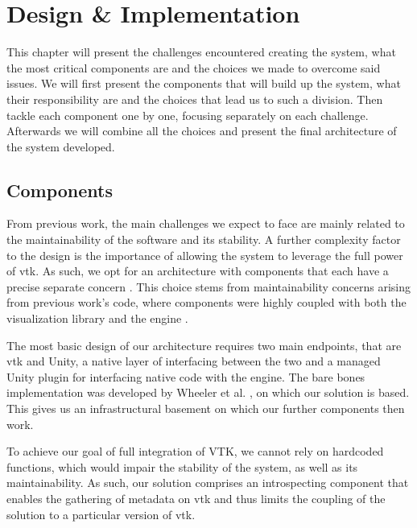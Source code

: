 \chapter{Design \& Implementation}
\label{ch:design}

This chapter will present the challenges encountered creating the system, what the most critical components are and the choices we made to overcome said issues. We will first present the components that will build up the system, what their responsibility are and the choices that lead us to such a division. Then tackle each component one by one, focusing separately on each challenge. Afterwards we will combine all the choices and present the final architecture of the system developed.

\section{Components}
\label{sec:components}

From previous work, the main challenges we expect to face are mainly related to the maintainability of the software and its stability. A further complexity factor to the design is the importance of allowing the system to leverage the full power of \acrshort{vtk}. As such, we opt for an architecture with components that each have a precise separate concern \cite{Hursch95separationof}. This choice stems from maintainability concerns arising from previous work's code, where components were highly coupled with both the visualization library and the engine \cite{dreuning_visual_2016, duking_potential_2018, kruis_creating_2017, wheeler_virtual_2018}.

The most basic design of our architecture requires two main endpoints, that are \acrshort{vtk} and Unity, a native layer of interfacing between the two and a managed Unity plugin for interfacing native code with the engine. The bare bones implementation was developed by Wheeler et al. \cite{wheeler_virtual_2018}, on which our solution is based. This gives us an infrastructural basement on which our further components then work.

To achieve our goal of full integration of VTK, we cannot rely on hardcoded functions, which would impair the stability of the system, as well as its maintainability. As such, our solution comprises an introspecting component that enables the gathering of metadata on \acrshort{vtk} and thus limits the coupling of the solution to a particular version of \acrshort{vtk}.

